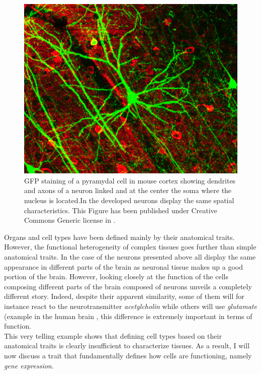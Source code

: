 \begin{figure}[bth]
\begin{center}
  \includegraphics[width=0.8\linewidth]{gfx/chapter1/neuron.png}
\end{center}
  \caption{GFP staining of a pyramydal cell in mouse cortex showing dendrites and axons of a neuron linked and at the center the soma where the nucleus is located.In \platy{} the developed neurons display the same spatial characteristics. This Figure has been published under Creative Commons Generic license in \citep{lee06}.}
  \label{fig:neuron}
\end{figure}
	
     
    Organs and cell types have been defined mainly by their anatomical traits. However, the functional heterogeneity of complex tissues goes further than simple anatomical traits. In the case of the neurons presented above all display the same appearance in different parts of the brain as neuronal tissue makes up a good portion of the brain. However, looking closely at the function of the cells composing different parts of the brain composed of neurons unveils a completely different story. Indeed, despite their apparent similarity, some of them will for instance react to the neurotransmitter \emph{acetylcholin} while others will use \emph{glutamate} (example in the human brain \cite{hefti86,van93}, this difference is extremely important in terms of function.\\
     
     This very telling example shows that defining cell types based on their anatomical traits is clearly insufficient to characterize tissues.  As a result, I will now discuss a trait that fundamentally defines how cells are functioning, namely \emph{gene expression}. 

